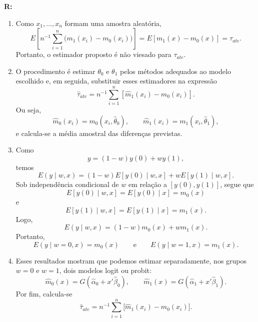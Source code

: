 \documentclass[12pt,letterpaper,onecolumn]{exam}
\renewenvironment{solution}
{\par\noindent\textbf{R:}\enspace\color{blue}}
{\par\color{black}}
\begin{document}
\begin{questions}
\begin{solution}
\begin{enumerate}[label=(\roman*)]
    \item Como \(x_1,\ldots,x_n\) formam uma amostra aleatória,
    \[
    E\!\left[n^{-1}\sum_{i=1}^{n}\big(m_1(x_i)-m_0(x_i)\big)\right]
    =
    E[m_1(x)-m_0(x)]
    =
    \tau_{ate}.
    \]
    Portanto, o estimador proposto é não viesado para \(\tau_{ate}\).

    \item O procedimento é estimar \(\theta_0\) e \(\theta_1\) pelos métodos adequados ao modelo escolhido e, em seguida, substituir esses estimadores na expressão
    \[
    \hat{\tau}_{ate}=n^{-1}\sum_{i=1}^{n}[\hat{m}_1(x_i)-\hat{m}_0(x_i)].
    \]
    Ou seja,
    \[
    \hat{m}_0(x_i)=m_0(x_i,\hat{\theta}_0),
    \qquad
    \hat{m}_1(x_i)=m_1(x_i,\hat{\theta}_1),
    \]
    e calcula-se a média amostral das diferenças previstas.

    \item Como
    \[
    y=(1-w)y(0)+wy(1),
    \]
    temos
    \[
    E(y\mid w,x)=(1-w)E[y(0)\mid w,x]+wE[y(1)\mid w,x].
    \]
    Sob independência condicional de \(w\) em relação a \([y(0),y(1)]\), segue que
    \[
    E[y(0)\mid w,x]=E[y(0)\mid x]=m_0(x)
    \]
    e
    \[
    E[y(1)\mid w,x]=E[y(1)\mid x]=m_1(x).
    \]
    Logo,
    \[
    E(y\mid w,x)=(1-w)m_0(x)+wm_1(x).
    \]
    Portanto,
    \[
    E(y\mid w=0,x)=m_0(x)
    \qquad \text{e} \qquad
    E(y\mid w=1,x)=m_1(x).
    \]

    \item Esses resultados mostram que podemos estimar separadamente, nos grupos \(w=0\) e \(w=1\), dois modelos logit ou probit:
    \[
    \hat{m}_0(x)=G(\hat{\alpha}_0+x'\hat{\beta}_0),
    \qquad
    \hat{m}_1(x)=G(\hat{\alpha}_1+x'\hat{\beta}_1).
    \]
    Por fim, calcula-se
    \[
    \hat{\tau}_{ate}=n^{-1}\sum_{i=1}^{n}\big[\hat{m}_1(x_i)-\hat{m}_0(x_i)\big].
    \]
\end{enumerate}
\end{solution}

\vspace{0.7cm}


\end{questions}
\end{document}

